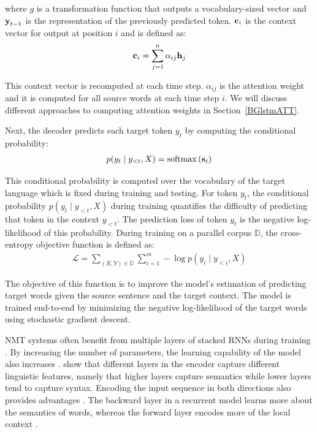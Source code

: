\noindent where $g$ is a transformation function that outputs a vocabulary-sized vector and $\bm{\mathbf{y}}_{t-1}$ is the representation of the previously predicted token.
$\bm{\mathbf{c}}_i$ is the context vector for output at position $i$ and is defined as:
\begin{align}
\bm{\mathbf{c}}_i = \sum_{j=1}^{n} \alpha_{ij} \bm{\mathbf{h}}_j
\end{align}

This context vector is recomputed at each time step.
$\alpha_{ij}$ is the attention weight and it is computed for all source words at each time step $i$.
We will discuss different approaches to computing attention weights in Section~\ref{BGlstmATT}.

Next, the decoder predicts each target token $y_t$ by computing the conditional probability:
\begin{align}
p(y_t \mid y_{<t}, X) = \operatorname*{softmax} \,(\bm{\mathbf{s}}_t)
\end{align}

This conditional probability is computed over the vocabulary of the target language which is fixed during training and testing. 
For token $y_t$, the conditional probability $p(y_t \mid y_{<t}, X)$ during training quantifies the difficulty of predicting that token in the context $y_{<t}$.
The prediction loss of token $y_t$ is the negative log-likelihood of this probability.
During training on a parallel corpus $\mathbb{D}$, the cross-entropy objective function is defined as:
\begin{align}
\mathcal{L} = \sum_{(X,Y) \in \mathbb{D}} \sum_{i=1}^{m} - \log p(y_i \mid y_{<i}, X)
\end{align}

The objective of this function is to improve the model's estimation of predicting target words given the source sentence and the target context. 
The model is trained end-to-end by minimizing the negative log-likelihood of the target words using stochastic gradient descent.

NMT systems often benefit from multiple layers of stacked RNNs during training \citep{wu2016google}. 
By increasing the number of parameters, the learning capability of the model also increases \citep{britz-etal-2017-massive}.
\citet{belinkov-etal-2017-neural} show that different layers in the encoder capture different linguistic features, namely that higher layers capture semantics while lower layers tend to capture syntax.
Encoding the input sequence in both directions also provides advantages \citep{luong:2015:EMNLP,DBLP:journals/corr/BahdanauCB14}. The backward layer in a recurrent model learns more about the semantics of words, whereas the forward layer encodes more of the local context \citep{ghader-monz-2019-intrinsic}.

